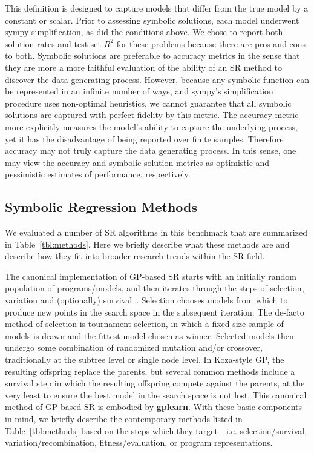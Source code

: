 This definition is designed to capture models that differ from the true model by a constant or scalar. 
Prior to assessing symbolic solutions, each model underwent sympy simplification, as did the conditions above. 
We chose to report both solution rates and test set $R^2$ for these problems because there are pros and cons to both. 
Symbolic solutions are preferable to accuracy metrics in the sense that they are more a more faithful evaluation of the ability of an SR method to discover the data generating process.
However, because any symbolic function can be represented in an infinite number of ways, and sympy's simplification procedure uses non-optimal heuristics, we cannot guarantee that all symbolic solutions are captured with perfect fidelity by this metric. 
The accuracy metric more explicitly measures the model's ability to capture the underlying process, yet it has the disadvantage of being reported over finite samples. 
Therefore accuracy may not truly capture the data generating process. 
In this sense, one may view the accuracy and symbolic solution metrics as optimistic and pessimistic estimates of performance, respectively.

\subsection{Symbolic Regression Methods}

We evaluated a number of SR algorithms in this benchmark that are summarized in Table~\ref{tbl:methods}.
Here we briefly describe what these methods are and describe how they fit into broader research trends within the SR field. 



The canonical implementation of GP-based SR starts with an initially random population of programs/models, and then iterates through the steps of selection, variation and (optionally) survival~\cite{poliFieldGuideGenetic2008}.
Selection chooses models from which to produce new points in the search space in the subsequent iteration. 
The de-facto method of selection is tournament selection, in which a fixed-size sample of models is drawn and the fittest model chosen as winner. 
Selected models then undergo some combination of randomized mutation and/or crossover, traditionally at the subtree level or single node level.
In Koza-style GP, the resulting offspring replace the parents, but several common methods include a survival step in which the resulting offspring compete against the parents, at the very least to ensure the best model in the search space is not lost.
This canonical method of GP-based SR is embodied by \textbf{gplearn}. 
With these basic components in mind, we briefly describe the contemporary methods listed in Table~\ref{tbl:methods} based on the steps which they target - i.e. selection/survival, variation/recombination, fitness/evaluation, or program representations. 

